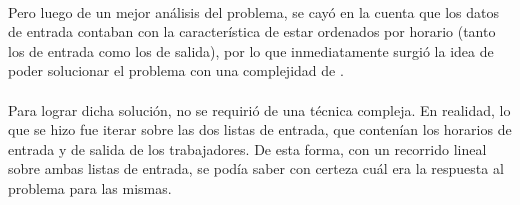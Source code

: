 \paragraph{}
Pero luego de un mejor an\'alisis del problema, se cay\'o en la cuenta que los datos de entrada contaban con la caracter\'istica de estar ordenados por horario (tanto los de entrada como los de salida), por lo que inmediatamente surgi\'o la idea de poder solucionar el problema con una complejidad de .

\paragraph{}
Para lograr dicha soluci\'on, no se requiri\'o de una t\'ecnica compleja. En realidad, lo que se hizo fue iterar sobre las dos listas de entrada, que conten\'ian los horarios de entrada y de salida de los trabajadores. De esta forma, con un recorrido lineal sobre ambas listas de entrada, se pod\'ia saber con certeza cu\'al era la respuesta al problema para las mismas.


